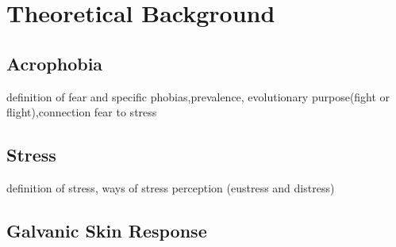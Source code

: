 \section{Theoretical Background}

\subsection{Acrophobia} 
definition of fear and specific phobias,prevalence, evolutionary 	 purpose(fight or flight),connection fear to stress
  
\subsection{Stress}
definition of stress, ways of stress perception (eustress and distress)

\subsection{Galvanic Skin Response}
%
%

